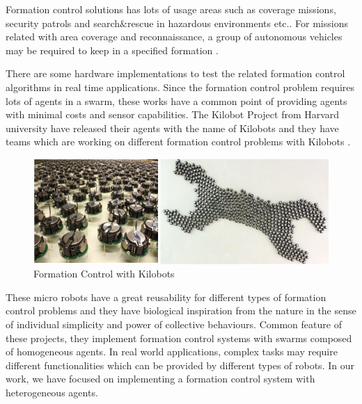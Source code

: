 Formation control solutions has lots of usage areas such as coverage missions, security patrols and search$\&$rescue in hazardous environments etc.\cite{13}. For missions related with area coverage and reconnaissance, a group of autonomous vehicles may be required to keep in a specified formation \cite{13}.  

There are some hardware implementations to test the related formation control algorithms in real time applications. Since the formation control problem requires lots of agents in a swarm, these works have a common point of providing agents with minimal costs and sensor capabilities. The Kilobot Project from Harvard university have released their agents with the name of Kilobots and they have teams which are working on different formation control problems with Kilobots \cite{98}.

\begin{figure}[H]
\caption{Formation Control with Kilobots \cite{98}}
\centering
\includegraphics[scale = 0.70]{kilobot}
\end{figure}

These micro robots have a great reusability for different types of formation control problems  and they have biological inspiration from the nature in the sense of individual simplicity and power of collective behaviours. Common feature of these projects, they implement formation control systems with swarms composed of homogeneous agents. In real world applications, complex tasks may require different functionalities which can be provided by different types of robots. In our work, we have focused on implementing a formation control system with heterogeneous agents.

